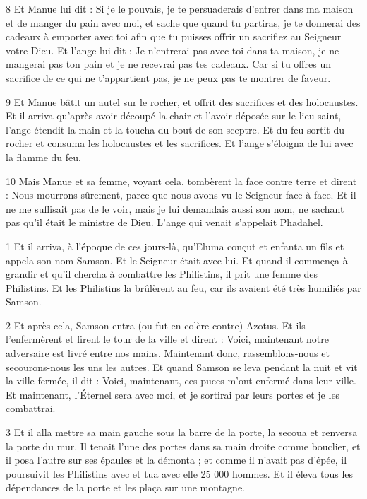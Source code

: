 \par 8 Et Manue lui dit : Si je le pouvais, je te persuaderais d'entrer dans ma maison et de manger du pain avec moi, et sache que quand tu partiras, je te donnerai des cadeaux à emporter avec toi afin que tu puisses offrir un sacrifiez au Seigneur votre Dieu. Et l'ange lui dit : Je n'entrerai pas avec toi dans ta maison, je ne mangerai pas ton pain et je ne recevrai pas tes cadeaux. Car si tu offres un sacrifice de ce qui ne t'appartient pas, je ne peux pas te montrer de faveur.

\par 9 Et Manue bâtit un autel sur le rocher, et offrit des sacrifices et des holocaustes. Et il arriva qu'après avoir découpé la chair et l'avoir déposée sur le lieu saint, l'ange étendit la main et la toucha du bout de son sceptre. Et du feu sortit du rocher et consuma les holocaustes et les sacrifices. Et l'ange s'éloigna de lui avec la flamme du feu.

\par 10 Mais Manue et sa femme, voyant cela, tombèrent la face contre terre et dirent : Nous mourrons sûrement, parce que nous avons vu le Seigneur face à face. Et il ne me suffisait pas de le voir, mais je lui demandais aussi son nom, ne sachant pas qu'il était le ministre de Dieu. L'ange qui venait s'appelait Phadahel.




\par 1 Et il arriva, à l'époque de ces jours-là, qu'Eluma conçut et enfanta un fils et appela son nom Samson. Et le Seigneur était avec lui. Et quand il commença à grandir et qu'il chercha à combattre les Philistins, il prit une femme des Philistins. Et les Philistins la brûlèrent au feu, car ils avaient été très humiliés par Samson.

\par 2 Et après cela, Samson entra (ou fut en colère contre) Azotus. Et ils l'enfermèrent et firent le tour de la ville et dirent : Voici, maintenant notre adversaire est livré entre nos mains. Maintenant donc, rassemblons-nous et secourons-nous les uns les autres. Et quand Samson se leva pendant la nuit et vit la ville fermée, il dit : Voici, maintenant, ces puces m'ont enfermé dans leur ville. Et maintenant, l'Éternel sera avec moi, et je sortirai par leurs portes et je les combattrai.

\par 3 Et il alla mettre sa main gauche sous la barre de la porte, la secoua et renversa la porte du mur. Il tenait l'une des portes dans sa main droite comme bouclier, et il posa l'autre sur ses épaules et la démonta ; et comme il n'avait pas d'épée, il poursuivit les Philistins avec et tua avec elle 25 000 hommes. Et il éleva tous les dépendances de la porte et les plaça sur une montagne.


